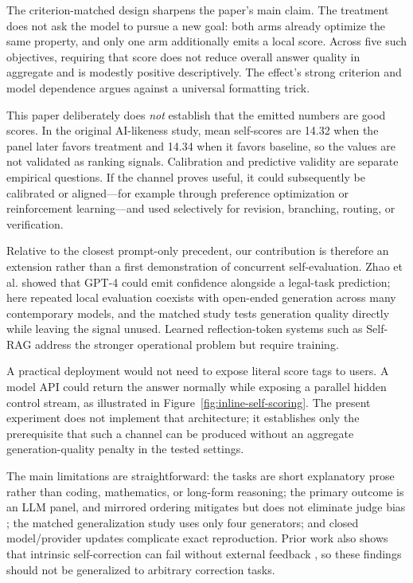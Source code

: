 \documentclass[11pt]{article}
\begin{document}
The criterion-matched design sharpens the paper's main claim. The treatment does not ask the model to pursue a new goal: both arms already optimize the same property, and only one arm additionally emits a local score. Across five such objectives, requiring that score does not reduce overall answer quality in aggregate and is modestly positive descriptively. The effect's strong criterion and model dependence argues against a universal formatting trick.

This paper deliberately does \emph{not} establish that the emitted numbers are good scores. In the original AI-likeness study, mean self-scores are 14.32 when the panel later favors treatment and 14.34 when it favors baseline, so the values are not validated as ranking signals. Calibration and predictive validity are separate empirical questions. If the channel proves useful, it could subsequently be calibrated or aligned---for example through preference optimization or reinforcement learning---and used selectively for revision, branching, routing, or verification.

Relative to the closest prompt-only precedent, our contribution is therefore an extension rather than a first demonstration of concurrent self-evaluation. Zhao et al. showed that GPT-4 could emit confidence alongside a legal-task prediction; here repeated local evaluation coexists with open-ended generation across many contemporary models, and the matched study tests generation quality directly while leaving the signal unused. Learned reflection-token systems such as Self-RAG address the stronger operational problem but require training.

A practical deployment would not need to expose literal score tags to users. A model API could return the answer normally while exposing a parallel hidden control stream, as illustrated in Figure~\ref{fig:inline-self-scoring}. The present experiment does not implement that architecture; it establishes only the prerequisite that such a channel can be produced without an aggregate generation-quality penalty in the tested settings.

The main limitations are straightforward: the tasks are short explanatory prose rather than coding, mathematics, or long-form reasoning; the primary outcome is an LLM panel, and mirrored ordering mitigates but does not eliminate judge bias \citep{zheng2023judging,calderon2025alternative}; the matched generalization study uses only four generators; and closed model/provider updates complicate exact reproduction. Prior work also shows that intrinsic self-correction can fail without external feedback \citep{huang2024cannot}, so these findings should not be generalized to arbitrary correction tasks.
\end{document}
